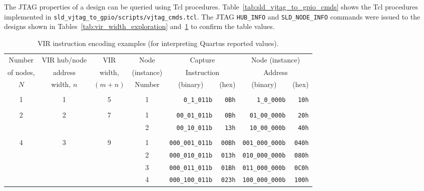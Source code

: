 \documentclass[10pt,twoside]{article}
\begin{document}
The JTAG properties of a design can be queried using Tcl procedures.
Table~\ref{tab:sld_vjtag_to_gpio_cmds} shows the Tcl procedures implemented
in \verb+sld_vjtag_to_gpio/scripts/vjtag_cmds.tcl+.
The JTAG \verb+HUB_INFO+ and \verb+SLD_NODE_INFO+ commands were
issued to the designs shown in Tables~\ref{tab:vir_width_exploration} 
and~\ref{tab:vir_instruction_examples} to confirm the table
values.

%
\begin{landscape}
\begin{table}
\caption{VIR instruction encoding examples (for interpreting Quartus reported values).}
\label{tab:vir_instruction_examples}
\begin{center}
\begin{tabular}{|c|c|c||c|r|r|r|r|}
\hline
Number    & VIR hub/node & VIR     & Node       & \multicolumn{2}{c|}{Capture}     & \multicolumn{2}{c|}{Node (instance)}\\
of nodes, & address      & width,  & (instance) & \multicolumn{2}{c|}{Instruction} & \multicolumn{2}{c|}{Address} \\
\cline{5-8}
$N$       & width, $n$   & $(m+n)$ & Number     & \multicolumn{1}{c|}{(binary)} & \multicolumn{1}{c|}{(hex)} & \multicolumn{1}{c|}{(binary)} & \multicolumn{1}{c|}{(hex)} \\
\hline\hline
&&&&&&&\\
1 & 1 &  5 & 1 &       \verb+0_1_011b+ & \verb+0Bh+ &        \verb+1_0_000b+ & \verb+10h+\\
&&&&&&&\\
2 & 2 &  7 & 1 &     \verb+00_01_011b+ & \verb+0Bh+ &      \verb+01_00_000b+ & \verb+20h+\\
  &   &    & 2 &     \verb+00_10_011b+ & \verb+13h+ &      \verb+10_00_000b+ & \verb+40h+\\
&&&&&&&\\
4 & 3 &  9 & 1 &   \verb+000_001_011b+ & \verb+00Bh+ &   \verb+001_000_000b+ & \verb+040h+\\
  &   &    & 2 &   \verb+000_010_011b+ & \verb+013h+ &   \verb+010_000_000b+ & \verb+080h+\\
  &   &    & 3 &   \verb+000_011_011b+ & \verb+01Bh+ &   \verb+011_000_000b+ & \verb+0C0h+\\
  &   &    & 4 &   \verb+000_100_011b+ & \verb+023h+ &   \verb+100_000_000b+ & \verb+100h+\\

\end{tabular}
\end{center}
\end{table}
\end{landscape}
\end{document}
